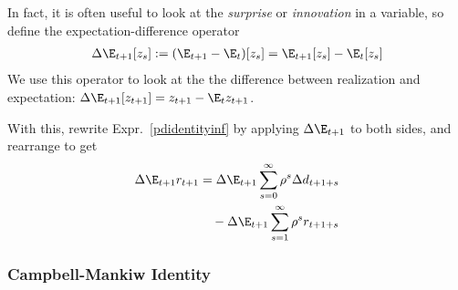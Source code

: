 \documentclass[12pt]{article}
\theoremstyle{plain}
\theoremstyle{definition}
\theoremstyle{remark}
\begin{document}
\begin{multicols*}{2}
\columnbreak
In fact, it is often useful to look at the \emph{surprise} or
\emph{innovation} in a variable, so define the expectation-difference
operator
\begin{align*}
  \Delta \E_{t+1}[z_s]
  := (\E_{t+1} - \E_{t})[z_s]
  = \E_{t+1}[z_s] - \E_{t}[z_s]
\end{align*}
We use this operator to look at the the difference between realization
and expectation:
$\Delta \E_{t+1}[z_{t+1}]=z_{t+1}-\E_{t}z_{t+1}$.


With this, rewrite Expr.~\ref{pdidentityinf} by applying $\Delta
\E_{t+1}$ to both sides, and rearrange to get
\begin{align}
  \Delta\E_{t+1}r_{t+1}
  &=
  \Delta \E_{t+1} \sum_{s=0}^\infty \rho^{s}\Delta d_{t+1+s}
  \notag
  \\
  &\quad
  -\Delta \E_{t+1} \sum_{s=1}^\infty \rho^{s}r_{t+1+s}
  \label{rsurprise}
\end{align}


\subsubsection{Campbell-Mankiw Identity}


\end{multicols*}
\end{document}
